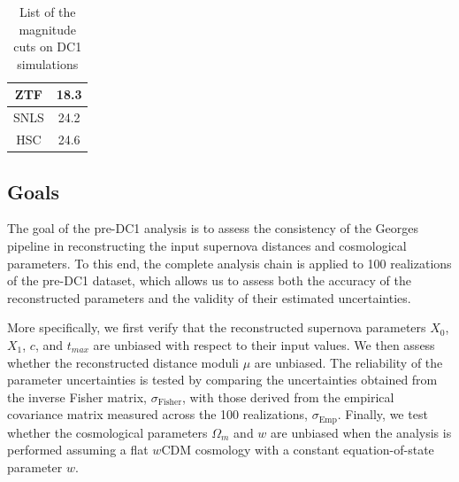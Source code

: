 \begin{table}[ht]
    \centering
    \begin{tabular}{ c  c }
    \hline
        ZTF & 18.3 \\
        \hline
        SNLS & 24.2 \\
        \hline
        HSC & 24.6 \\
    \hline
    \end{tabular}
    \caption{List of the magnitude cuts on DC1 simulations}
    \label{tab:mag_cuts}
\end{table}


\subsection{Goals}

The goal of the pre-DC1 analysis is to assess the consistency of the 
Georges pipeline in reconstructing the input supernova distances and 
cosmological parameters. To this end, the complete analysis chain is applied 
to 100 realizations of the pre-DC1 dataset, which allows us to assess both the 
accuracy of the reconstructed parameters and the validity of their estimated 
uncertainties. 

More specifically, we first verify that the reconstructed supernova 
parameters $X_0$, $X_1$, $c$, and $t_{max}$ are unbiased with respect 
to their input values. We then assess whether the reconstructed distance 
moduli $\mu$ are unbiased. The reliability of the parameter uncertainties is 
tested by comparing the uncertainties obtained from the inverse Fisher 
matrix, $\sigma_{\text{Fisher}}$, with those derived from the empirical 
covariance matrix measured across the 100 realizations, 
$\sigma_{\text{Emp}}$. Finally, we test whether the cosmological parameters 
$\Omega_m$ and $w$ are unbiased when the analysis is performed assuming a 
flat $w$CDM cosmology with a constant equation-of-state parameter $w$. 